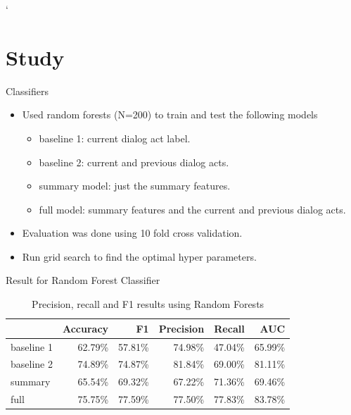 `%

\section{Study}
\frame{\sectionpage}


\begin{frame}{Classifiers}
 \begin{itemize}
  \item Used random forests (N=200) to train and test the following models
  \begin{itemize}
    \item baseline 1: current dialog act label.
    \item baseline 2: current and previous dialog acts.
    \item summary model: just the summary features.
    \item full model: summary features and the current and previous dialog acts.
  \end{itemize}
  \item Evaluation was done using 10 fold cross validation.
  \item Run grid search to find the optimal hyper parameters.
  \end{itemize}
\end{frame}{}

\begin{frame}{Result for Random Forest Classifier}
\begin{table}[ht!]
\begin{center}
\begin{tabular}{lrrrrr}
\hline
{}  &  Accuracy &        F1 &  Precision &    Recall &   AUC \\
\hline
baseline 1 &  62.79\% &  57.81\% &   74.98\% &  47.04\% &  65.99\% \\
baseline 2 &  74.89\% &  74.87\% &   81.84\% &  69.00\% &  81.11\% \\
summary    &  65.54\% &  69.32\% &   67.22\% &  71.36\% &  69.46\% \\
full       &  75.75\% &  77.59\% &   77.50\% &  77.83\% &  83.78\% \\
\hline
\end{tabular}
\end{center}
\caption{Precision, recall and F1 results using Random Forests }
\label{table:result}
\end{table}
\end{frame}

